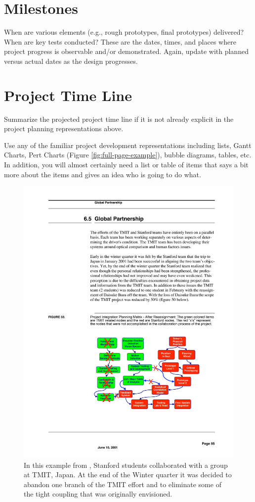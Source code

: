 \section{Milestones}
When are various elements (e.g., rough prototypes, final prototypes) delivered? When are key tests conducted? These are the dates, times, and places where project progress is observable and/or demonstrated. Again, update with planned versus actual dates as the design progresses.

\section{Project Time Line}
Summarize the projected project time line if it is not already explicit in the project planning representations above.

Use any of the familiar project development representations including lists, Gantt Charts, Pert Charts (Figure \ref{fig:full-page-example}), bubble diagrams, tables, etc. In addition, you will almost certainly need a list or table of items that says a bit
more about the items and gives an idea who is going to do what.

\begin{figure}[bhtp] 
\centering
		\includegraphics[width=\textwidth]{Figures/Ch6/su-tmit-after.pdf}
	\caption[Project task replanning example]{In this example from \cite{Toyota01}, Stanford students collaborated with a group at TMIT, Japan. At the end of the Winter quarter it was decided to abandon one branch of the TMIT effort and to eliminate some of the tight coupling that was originally envisioned. }
	\label{fig:su-tmit}  %
\end{figure}

